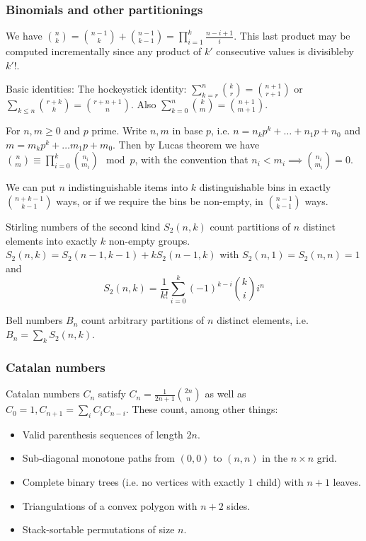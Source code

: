 \documentclass[
	a4paper,
	landscape,
	10pt,
	article
]{article}
\begin{document}
\subsubsection*{Binomials and other partitionings}
We have $\binom{n}{k} = \binom{n-1}{k}+\binom{n-1}{k-1} =
	\prod_{i=1}^k \frac{n-i+1}{i}$. This last product may be computed
incrementally since any product of $k'$ consecutive values is divisibleby
$k'!$.

Basic identities: The hockeystick identity: $\sum_{k=r}^n \binom{k}{r}
	= \binom{n+1}{r+1}$
or $\sum_{k\leq n}\binom{r+k}{k} = \binom{r+n+1}{n}$.
Also $\sum_{k=0}^n \binom{k}{m} = \binom{n+1}{m+1}$.

For $n, m \geq 0$ and $p$ prime. Write $n, m$ in base $p$, i.e.
$n = n_k p^k + \dots + n_1 p + n_0$ and $m = m_k p^k + \dots m_1 p + m_0$. Then
by Lucas theorem we have $\binom{n}{m} \equiv \prod_{i=0}^k \binom{n_i}{m_i}
	\mod p$, with the convention that $n_i < m_i \implies \binom{n_i}{m_i} =0$.



We can put $n$ indistinguishable items into $k$ distinguishable bins in exactly
$\binom{n+k-1}{k-1}$ ways, or if we require the bins be non-empty, in
$\binom{n-1}{k-1}$ ways.

Stirling numbers of the second kind $S_2(n, k)$ count partitions of $n$
distinct elements into exactly $k$ non-empty groups.
$S_2(n, k) = S_2(n-1, k-1) + kS_2(n-1, k)$ with $S_2(n, 1) = S_2(n, n) = 1$ and
$$S_2(n, k) = \frac{1}{k!}\sum_{i=0}^k (-1)^{k-i}\binom{k}{i}i^n$$

Bell numbers $B_n$ count arbitrary partitions of $n$ distinct elements, i.e.
$B_n = \sum_k S_2(n, k)$.

\subsubsection*{Catalan numbers}
Catalan numbers $C_n$ satisfy $C_n = \frac{1}{2n+1}\binom{2n}{n}$ as well
as $C_0 = 1, C_{n+1} = \sum_i C_i C_{n-i}$. These count, among other things:
\begin{itemize}
	\item Valid parenthesis sequences of length $2n$.
	\item Sub-diagonal monotone paths from $(0, 0)$ to $(n, n)$ in the
		$n\times n$ grid.
	\item Complete binary trees (i.e. no vertices with exactly $1$ child)
		with $n+1$ leaves.
	\item Triangulations of a convex polygon with $n+2$ sides.
	\item Stack-sortable permutations of size $n$.
\end{itemize}
\end{document}
